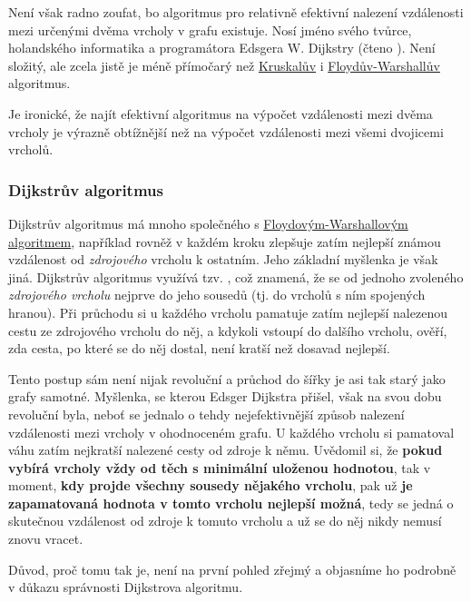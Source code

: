 Není však radno zoufat, bo algoritmus pro relativně efektivní nalezení
vzdálenosti mezi určenými dvěma vrcholy v grafu existuje. Nosí jméno svého
tvůrce, holandského informatika a programátora Edsgera W. Dijk\-stry (čteno
). Není složitý, ale zcela jistě je méně přímočarý než
\hyperref[alg:kruskal]{Kruskalův} i
\hyperref[alg:floyd-warshall]{Floydův-Warshallův} algoritmus.

Je ironické, že najít efektivní algoritmus na výpočet vzdálenosti mezi dvě\-ma
vrcholy je výrazně obtížnější než na výpočet vzdálenosti mezi všemi dvojicemi
vrcholů.

\subsubsection{Dijkstrův algoritmus}
\label{sssec:dijkstruv-algoritmus}

Dijkstrův algoritmus má mnoho společného s
\hyperref[alg:floyd-warshall]{Floydovým-Warshallovým algoritmem}, například
rovněž v každém kroku zlepšuje zatím nejlepší známou vzdálenost od
\emph{zdrojového} vrcholu k ostatním. Jeho základní myšlenka je však jiná.
Dijkstrův algoritmus využívá tzv. , což znamená, že se
 od jednoho zvoleného \emph{zdrojového vrcholu} nejprve do jeho sousedů
(tj. do vrcholů s ním spojených hranou). Při průchodu si u každého vrcholu
pamatuje zatím nejlepší nalezenou cestu ze zdrojového vrcholu do něj, a kdykoli
vstoupí do dalšího vrcholu, ověří, zda cesta, po které se do něj dostal, není
kratší než dosavad nejlepší.

Tento postup sám není nijak revoluční a průchod do šířky je asi tak starý jako
grafy samotné. Myšlenka, se kterou Edsger Dijkstra přišel, však na svou dobu
revoluční byla, neboť se jednalo o tehdy nejefektivnější způsob nalezení
vzdálenosti mezi vrcholy v ohodnoceném grafu. U každého vrcholu si pamatoval
váhu zatím nejkratší nalezené cesty od zdroje k němu. Uvědomil si, že
\textbf{pokud vybírá vrcholy vždy od těch s minimální uloženou hodnotou}, tak v
moment, \textbf{kdy projde všechny sousedy nějakého vrcholu}, pak už \textbf{je
zapamatovaná hodnota v tomto vrcholu nejlepší možná}, tedy se jedná o skutečnou
vzdálenost od zdroje k tomuto vrcholu a už se do něj nikdy nemusí znovu vracet.

Důvod, proč tomu tak je, není na první pohled zřejmý a objasníme ho podrobně v
důkazu správnosti Dijkstrova algoritmu.


